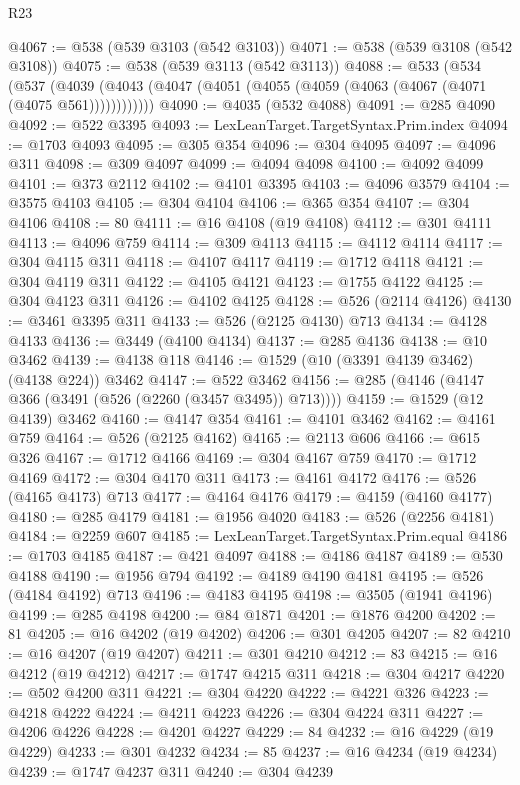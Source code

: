 \begin{lexlean}{R23}
\begin{coremodule}
@4067 := @538 (@539 @3103 (@542 @3103))
@4071 := @538 (@539 @3108 (@542 @3108))
@4075 := @538 (@539 @3113 (@542 @3113))
@4088 := @533
    (@534
      (@537 (@4039 (@4043 (@4047 (@4051 (@4055 (@4059 (@4063 (@4067 (@4071 (@4075 @561))))))))))))
@4090 := @4035 (@532 @4088)
@4091 := @285 @4090
@4092 := @522 @3395
@4093 := LexLeanTarget.TargetSyntax.Prim.index
@4094 := @1703 @4093
@4095 := @305 @354
@4096 := @304 @4095
@4097 := @4096 @311
@4098 := @309 @4097
@4099 := @4094 @4098
@4100 := @4092 @4099
@4101 := @373 @2112
@4102 := @4101 @3395
@4103 := @4096 @3579
@4104 := @3575 @4103
@4105 := @304 @4104
@4106 := @365 @354
@4107 := @304 @4106
@4108 := 80
@4111 := @16 @4108 (@19 @4108)
@4112 := @301 @4111
@4113 := @4096 @759
@4114 := @309 @4113
@4115 := @4112 @4114
@4117 := @304 @4115 @311
@4118 := @4107 @4117
@4119 := @1712 @4118
@4121 := @304 @4119 @311
@4122 := @4105 @4121
@4123 := @1755 @4122
@4125 := @304 @4123 @311
@4126 := @4102 @4125
@4128 := @526 (@2114 @4126)
@4130 := @3461 @3395 @311
@4133 := @526 (@2125 @4130) @713
@4134 := @4128 @4133
@4136 := @3449 (@4100 @4134)
@4137 := @285 @4136
@4138 := @10 @3462
@4139 := @4138 @118
@4146 := @1529 (@10 (@3391 @4139 @3462) (@4138 @224)) @3462
@4147 := @522 @3462
@4156 := @285 (@4146 (@4147 @366 (@3491 (@526 (@2260 (@3457 @3495)) @713))))
@4159 := @1529 (@12 @4139) @3462
@4160 := @4147 @354
@4161 := @4101 @3462
@4162 := @4161 @759
@4164 := @526 (@2125 @4162)
@4165 := @2113 @606
@4166 := @615 @326
@4167 := @1712 @4166
@4169 := @304 @4167 @759
@4170 := @1712 @4169
@4172 := @304 @4170 @311
@4173 := @4161 @4172
@4176 := @526 (@4165 @4173) @713
@4177 := @4164 @4176
@4179 := @4159 (@4160 @4177)
@4180 := @285 @4179
@4181 := @1956 @4020
@4183 := @526 (@2256 @4181)
@4184 := @2259 @607
@4185 := LexLeanTarget.TargetSyntax.Prim.equal
@4186 := @1703 @4185
@4187 := @421 @4097
@4188 := @4186 @4187
@4189 := @530 @4188
@4190 := @1956 @794
@4192 := @4189 @4190 @4181
@4195 := @526 (@4184 @4192) @713
@4196 := @4183 @4195
@4198 := @3505 (@1941 @4196)
@4199 := @285 @4198
@4200 := @84 @1871
@4201 := @1876 @4200
@4202 := 81
@4205 := @16 @4202 (@19 @4202)
@4206 := @301 @4205
@4207 := 82
@4210 := @16 @4207 (@19 @4207)
@4211 := @301 @4210
@4212 := 83
@4215 := @16 @4212 (@19 @4212)
@4217 := @1747 @4215 @311
@4218 := @304 @4217
@4220 := @502 @4200 @311
@4221 := @304 @4220
@4222 := @4221 @326
@4223 := @4218 @4222
@4224 := @4211 @4223
@4226 := @304 @4224 @311
@4227 := @4206 @4226
@4228 := @4201 @4227
@4229 := 84
@4232 := @16 @4229 (@19 @4229)
@4233 := @301 @4232
@4234 := 85
@4237 := @16 @4234 (@19 @4234)
@4239 := @1747 @4237 @311
@4240 := @304 @4239

\end{coremodule}
\end{lexlean}
